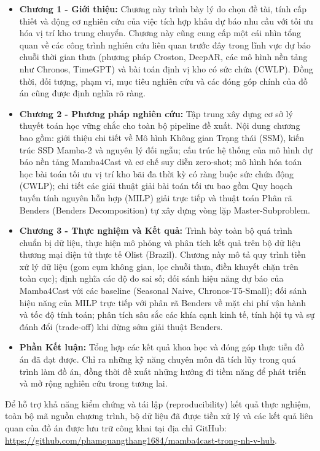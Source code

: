 \begin{itemize}
    \item \textbf{Chương 1 - Giới thiệu:} Chương này trình bày lý do chọn đề tài, tính cấp thiết và động cơ nghiên cứu của việc tích hợp khâu dự báo nhu cầu với tối ưu hóa vị trí kho trung chuyển. Chương này cũng cung cấp một cái nhìn tổng quan về các công trình nghiên cứu liên quan trước đây trong lĩnh vực dự báo chuỗi thời gian thưa (phương pháp Croston, DeepAR, các mô hình nền tảng như Chronos, TimeGPT) và bài toán định vị kho có sức chứa (CWLP). Đồng thời, đối tượng, phạm vi, mục tiêu nghiên cứu và các đóng góp chính của đồ án cũng được định nghĩa rõ ràng.
    
    \item \textbf{Chương 2 - Phương pháp nghiên cứu:} Tập trung xây dựng cơ sở lý thuyết toán học vững chắc cho toàn bộ pipeline đề xuất. Nội dung chương bao gồm: giới thiệu chi tiết về Mô hình Không gian Trạng thái (SSM), kiến trúc SSD Mamba-2 và nguyên lý đối ngẫu; cấu trúc hệ thống của mô hình dự báo nền tảng Mamba4Cast và cơ chế suy diễn zero-shot; mô hình hóa toán học bài toán tối ưu vị trí kho bãi đa thời kỳ có ràng buộc sức chứa động (CWLP); chi tiết các giải thuật giải bài toán tối ưu bao gồm Quy hoạch tuyến tính nguyên hỗn hợp (MILP) giải trực tiếp và thuật toán Phân rã Benders (Benders Decomposition) tự xây dựng vòng lặp Master-Subproblem.
    
    \item \textbf{Chương 3 - Thực nghiệm và Kết quả:} Trình bày toàn bộ quá trình chuẩn bị dữ liệu, thực hiện mô phỏng và phân tích kết quả trên bộ dữ liệu thương mại điện tử thực tế Olist (Brazil). Chương này mô tả quy trình tiền xử lý dữ liệu (gom cụm không gian, lọc chuỗi thưa, điền khuyết chặn trên toàn cục); định nghĩa các độ đo sai số; đối sánh hiệu năng dự báo của Mamba4Cast với các baseline (Seasonal Naive, Chronos-T5-Small); đối sánh hiệu năng của MILP trực tiếp với phân rã Benders về mặt chi phí vận hành và tốc độ tính toán; phân tích sâu sắc các khía cạnh kinh tế, tính hội tụ và sự đánh đổi (trade-off) khi dừng sớm giải thuật Benders.
    
    \item \textbf{Phần Kết luận:} Tổng hợp các kết quả khoa học và đóng góp thực tiễn đồ án đã đạt được. Chỉ ra những kỹ năng chuyên môn đã tích lũy trong quá trình làm đồ án, đồng thời đề xuất những hướng đi tiềm năng để phát triển và mở rộng nghiên cứu trong tương lai.
\end{itemize}

Để hỗ trợ khả năng kiểm chứng và tái lập (reproducibility) kết quả thực nghiệm, toàn bộ mã nguồn chương trình, bộ dữ liệu đã được tiền xử lý và các kết quả liên quan của đồ án được lưu trữ công khai tại địa chỉ GitHub: \url{https://github.com/phamquangthang1684/mamba4cast-trong-nh-v-hub}.


